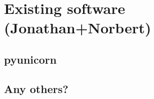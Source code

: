 \section{Existing software {\bf{(Jonathan+Norbert)}}}
	\subsection{{\color{red} pyunicorn}  }
	
	\subsection{{\color{red} Any others?}  }
